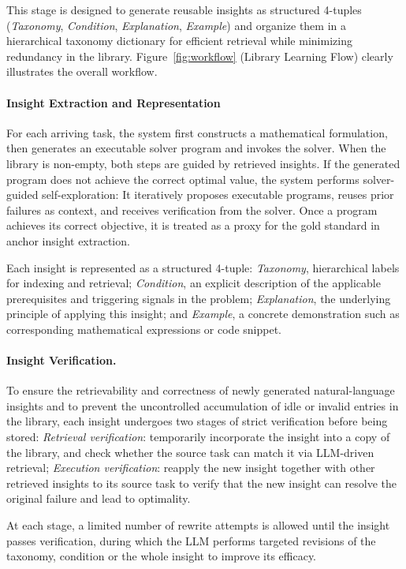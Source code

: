 \documentclass[sigconf, nonacm]{acmart}
\begin{document}
This stage is designed to generate reusable insights as structured 4-tuples (\textit{Taxonomy}, \textit{Condition}, \textit{Explanation}, \textit{Example}) and organize them in a hierarchical taxonomy dictionary for efficient retrieval while minimizing redundancy in the library. Figure~\ref{fig:workflow} (Library Learning Flow) clearly illustrates the overall workflow.

\paragraph{\textbf{Insight Extraction and Representation}}
For each arriving task, the system first constructs a mathematical formulation, then generates an executable solver program and invokes the solver. When the library is non-empty, both steps are guided by retrieved insights. If the generated program does not achieve the correct optimal value, the system performs solver-guided self-exploration: It iteratively proposes executable programs, reuses prior failures as context, and receives verification from the solver. Once a program achieves its correct objective, it is treated as a proxy for the gold standard in anchor insight extraction.

Each insight is represented as a structured 4-tuple: \textit{Taxonomy}, hierarchical labels for indexing and retrieval; \textit{Condition}, an explicit description of the applicable prerequisites and triggering signals in the problem; \textit{Explanation}, the underlying principle of applying this insight; and \textit{Example}, a concrete demonstration such as corresponding mathematical expressions or code snippet. 

\paragraph{\textbf{Insight Verification.}}
To ensure the retrievability and correctness of newly generated natural-language insights and to prevent the uncontrolled accumulation of idle or invalid entries in the library, each insight undergoes two stages of strict verification before being stored:
\emph{Retrieval verification}: temporarily incorporate the insight into a copy of the library, and check whether the source task can match it via LLM-driven retrieval;
\emph{Execution verification}: reapply the new insight together with other retrieved insights to its source task to verify that the new insight can resolve the original failure and lead to optimality.

At each stage, a limited number of rewrite attempts is allowed until the insight passes verification, during which the LLM performs targeted revisions of the taxonomy, condition or the whole insight to improve its efficacy.
\end{document}
